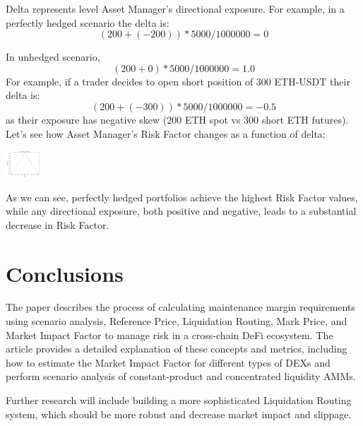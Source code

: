 \documentclass[conference]{IEEEtran}
\begin{document}
Delta represents level Asset Manager’s directional exposure. For example, in a perfectly hedged scenario the delta is: $$(200 + (-200)) * 5000 / 1 000 000 = 0$$ 

In unhedged scenario, $$(200 + 0) * 5000 / 1 000 000 = 1.0$$ For example, if a trader decides to open short position of 300 ETH-USDT their delta is: $$(200 + (-300))*5000 / 1 000 000 = -0.5$$
as their exposure has negative skew (200 ETH spot vs 300 short ETH futures). 
Let’s see how Asset Manager’s Risk Factor changes as a function of delta:

\includegraphics[height=1cm]{images/delta_vs_rf.png}


As we can see, perfectly hedged portfolios achieve the highest Risk Factor values, while any directional exposure, both positive and negative, leads to a substantial decrease in Risk Factor.

\section{Conclusions}
The paper describes the process of calculating maintenance margin requirements using scenario analysis, Reference Price, Liquidation Routing, Mark Price, and Market Impact Factor to manage risk in a cross-chain DeFi ecosystem. The article provides a detailed explanation of these concepts and metrics, including how to estimate the Market Impact Factor for different types of DEXs and perform scenario analysis of constant-product and concentrated liquidity AMMs. 

Further research will include building a more sophisticated Liquidation Routing system, which should be more robust and decrease market impact and slippage.






\newpage

\begin{appendices}
\end{appendices}
\end{document}
